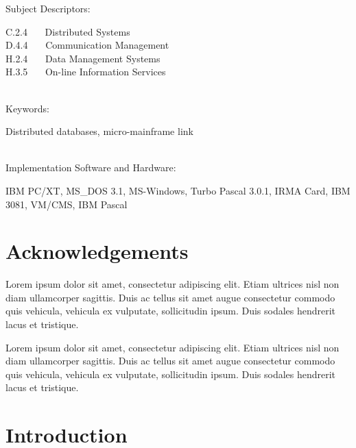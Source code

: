 \documentclass[a4paper, 12pt, fleqn]{report}
\begin{document}
\noindent Subject Descriptors:
\\ \begin{addmargin}[2em]{2em}
    C.2.4 \ \ \ Distributed Systems
    \\ D.4.4 \ \ \ Communication Management
    \\ H.2.4 \ \ \ Data Management Systems
    \\ H.3.5 \ \ \ On-line Information Services
\end{addmargin}
\ \\

\noindent Keywords:
\\ \begin{addmargin}[2em]{2em}
    Distributed databases, micro-mainframe link
\end{addmargin}
\ \\ 

\noindent Implementation Software and Hardware:
\\ \begin{addmargin}[2em]{2em}
    IBM PC/XT, MS\_DOS 3.1, MS-Windows, Turbo Pascal 3.0.1, IRMA Card, IBM 3081, VM/CMS, IBM Pascal
\end{addmargin}


\chapter*{Acknowledgements}
\doublespacing

\noindent Lorem ipsum dolor sit amet, consectetur adipiscing elit. Etiam ultrices nisl
non diam ullamcorper sagittis. Duis ac tellus sit amet augue consectetur commodo quis
vehicula, vehicula ex vulputate, sollicitudin ipsum. Duis sodales hendrerit lacus
et tristique.\newline

\noindent Lorem ipsum dolor sit amet, consectetur adipiscing elit. Etiam ultrices nisl
non diam ullamcorper sagittis. Duis ac tellus sit amet augue consectetur commodo quis
vehicula, vehicula ex vulputate, sollicitudin ipsum. Duis sodales hendrerit lacus
et tristique.\newline

\singlespacing

\tableofcontents


\newpage


\chapter{Introduction}
\end{document}
